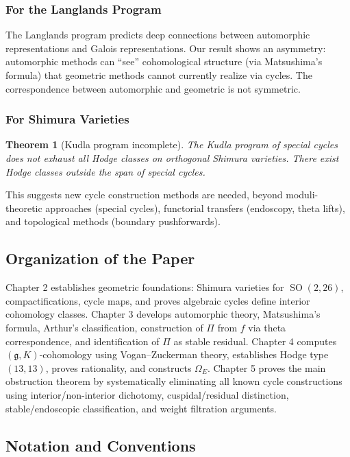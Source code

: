 \documentclass[12pt]{amsart}
\newtheorem{theorem}{Theorem}[section]
\theoremstyle{definition}
\DeclareMathOperator\SO{SO}
\begin{document}
\subsubsection{For the Langlands Program}

The Langlands program predicts deep connections between automorphic representations and Galois representations. Our result shows an asymmetry: automorphic methods can ``see'' cohomological structure (via Matsushima's formula) that geometric methods cannot currently realize via cycles. The correspondence between automorphic and geometric is not symmetric.

\subsubsection{For Shimura Varieties}

\begin{theorem}[Kudla program incomplete]
The Kudla program of special cycles does not exhaust all Hodge classes on orthogonal Shimura varieties. There exist Hodge classes outside the span of special cycles.
\end{theorem}

This suggests new cycle construction methods are needed, beyond moduli-theoretic approaches (special cycles), functorial transfers (endoscopy, theta lifts), and topological methods (boundary pushforwards).

\subsection{Organization of the Paper} {Chapter 2} establishes geometric foundations: Shimura varieties for $\SO(2,26)$, compactifications, cycle maps, and proves algebraic cycles define interior cohomology classes. Chapter 3 develops automorphic theory, Matsushima's formula, Arthur's classification, construction of $\Pi$ from $f$ via theta correspondence, and identification of $\Pi$ as stable residual. Chapter 4 computes $(\mathfrak{g},K)$-cohomology using Vogan--Zuckerman theory, establishes Hodge type $(13,13)$, proves rationality, and constructs $\Omega_E$. Chapter 5 proves the main obstruction theorem by systematically eliminating all known cycle constructions using interior/non-interior dichotomy, cuspidal/residual distinction, stable/endoscopic classification, and weight filtration arguments.






\subsection{Notation and Conventions}
\end{document}
